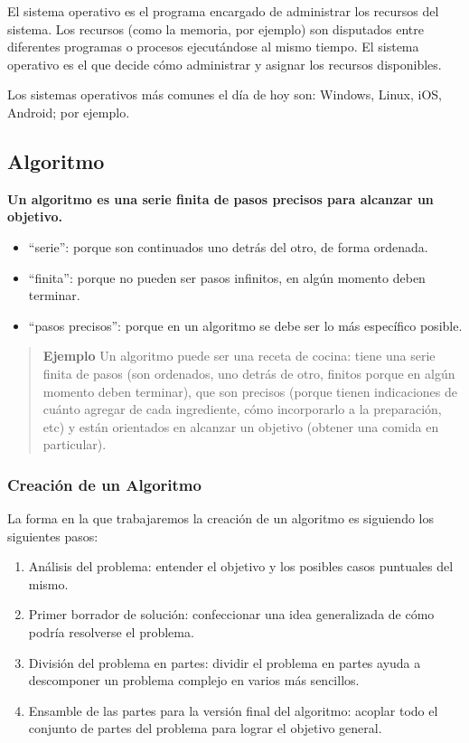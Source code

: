 \documentclass[
  letterpaper,
  DIV=11,
  numbers=noendperiod]{scrreprt}
\providecommand{\tightlist}{%
  \setlength{\itemsep}{0pt}\setlength{\parskip}{0pt}}\usepackage{longtable,booktabs,array}
\begin{document}
El sistema operativo es el programa encargado de administrar los
recursos del sistema. Los recursos (como la memoria, por ejemplo) son
disputados entre diferentes programas o procesos ejecutándose al mismo
tiempo. El sistema operativo es el que decide cómo administrar y asignar
los recursos disponibles.

Los sistemas operativos más comunes el día de hoy son: Windows, Linux,
iOS, Android; por ejemplo.

\subsection{Algoritmo}\label{algoritmo}

\textbf{Un algoritmo es una serie finita de pasos precisos para alcanzar
un objetivo.}

\begin{itemize}
\tightlist
\item
  ``serie'': porque son continuados uno detrás del otro, de forma
  ordenada.
\item
  ``finita'': porque no pueden ser pasos infinitos, en algún momento
  deben terminar.
\item
  ``pasos precisos'': porque en un algoritmo se debe ser lo más
  específico posible.
\end{itemize}

\begin{quote}
\textbf{Ejemplo} Un algoritmo puede ser una receta de cocina: tiene una
serie finita de pasos (son ordenados, uno detrás de otro, finitos porque
en algún momento deben terminar), que son precisos (porque tienen
indicaciones de cuánto agregar de cada ingrediente, cómo incorporarlo a
la preparación, etc) y están orientados en alcanzar un objetivo (obtener
una comida en particular).
\end{quote}

\subsubsection{Creación de un
Algoritmo}\label{creaciuxf3n-de-un-algoritmo}

La forma en la que trabajaremos la creación de un algoritmo es siguiendo
los siguientes pasos:

\begin{enumerate}
\def\labelenumi{\arabic{enumi}.}
\tightlist
\item
  Análisis del problema: entender el objetivo y los posibles casos
  puntuales del mismo.\\
\item
  Primer borrador de solución: confeccionar una idea generalizada de
  cómo podría resolverse el problema.\\
\item
  División del problema en partes: dividir el problema en partes ayuda a
  descomponer un problema complejo en varios más sencillos.\\
\item
  Ensamble de las partes para la versión final del algoritmo: acoplar
  todo el conjunto de partes del problema para lograr el objetivo
  general.\\
\end{enumerate}
\end{document}
